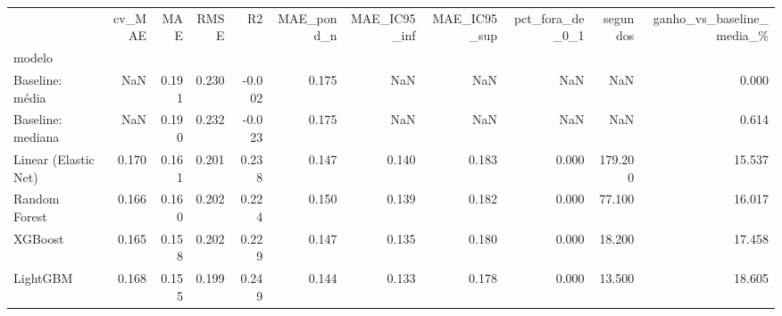 \begin{tabular}{lrrrrrrrrrr}
\toprule
 & cv\_MAE & MAE & RMSE & R2 & MAE\_pond\_n & MAE\_IC95\_inf & MAE\_IC95\_sup & pct\_fora\_de\_0\_1 & segundos & ganho\_vs\_baseline\_media\_\% \\
modelo &  &  &  &  &  &  &  &  &  &  \\
\midrule
Baseline: média & NaN & 0.191 & 0.230 & -0.002 & 0.175 & NaN & NaN & NaN & NaN & 0.000 \\
Baseline: mediana & NaN & 0.190 & 0.232 & -0.023 & 0.175 & NaN & NaN & NaN & NaN & 0.614 \\
Linear (Elastic Net) & 0.170 & 0.161 & 0.201 & 0.238 & 0.147 & 0.140 & 0.183 & 0.000 & 179.200 & 15.537 \\
Random Forest & 0.166 & 0.160 & 0.202 & 0.224 & 0.150 & 0.139 & 0.182 & 0.000 & 77.100 & 16.017 \\
XGBoost & 0.165 & 0.158 & 0.202 & 0.229 & 0.147 & 0.135 & 0.180 & 0.000 & 18.200 & 17.458 \\
LightGBM & 0.168 & 0.155 & 0.199 & 0.249 & 0.144 & 0.133 & 0.178 & 0.000 & 13.500 & 18.605 \\
\bottomrule
\end{tabular}
